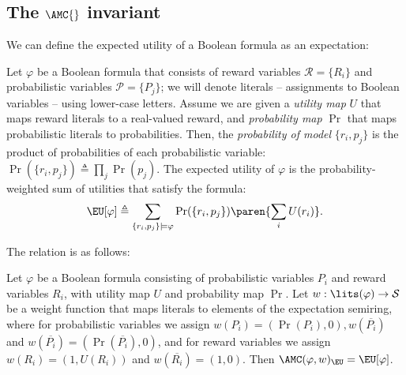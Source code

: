 \subsection{The $\AMC{}$ invariant}\label{appendix:amc invariant}

We can define the expected utility of a Boolean formula as an expectation:

\begin{definition}\label{def:eu-of-formula}
  Let $\varphi$ be a Boolean formula that consists of reward variables
  $\mathcal{R} = \{R_i\}$ and probabilistic variables $\mathcal{P} = \{P_j\}$; 
  we will denote literals -- assignments to Boolean variables -- using lower-case letters.
  Assume we are given a \emph{utility map} $U$ that maps
  reward literals to a real-valued reward, and \emph{probability map} $\Pr$ that maps
  probabilistic literals to probabilities.
  Then, the \emph{probability of model} $\{r_i,p_j\}$
  is the product of probabilities of each probabilistic variable:
    $\Pr(\{r_i, p_j\}) \triangleq \prod_{j} \Pr(p_j).$
  The expected utility of $\varphi$ is the probability-weighted sum of
  utilities that satisfy the formula:
  \begin{align}
    \EU[\varphi] \triangleq \sum_{\{r_i, p_j\} \models \varphi} \Pr(\{r_i, p_j\}) \paren{\sum_{i} U(r_i)}.
  \end{align}
\end{definition}

The relation is as follows:

\begin{theorem}\label{thm:amc invariant}
  Let $\varphi$ be a Boolean formula consisting of probabilistic variables $P_i$
  and reward variables $R_i$, with utility map $U$ and probability map $\Pr$.
  Let $w: \lits(\varphi) \rightarrow \mathcal{S}$ be a weight function that maps
  literals to elements of the expectation semiring, where for probabilistic 
  variables we assign $w(P_i) = (\Pr(P_i), 0), w(\overline{P_i})$ and
  $w(\overline{P_i}) = (\Pr(\overline{P_i}), 0)$, and for reward variables we
  assign $w(R_i) = (1, U(R_i))$ and $w(\overline{R_i}) = (1, 0)$. Then
  $\AMC(\varphi, w)_{\EU} =  \EU[\varphi]$.
\end{theorem}

